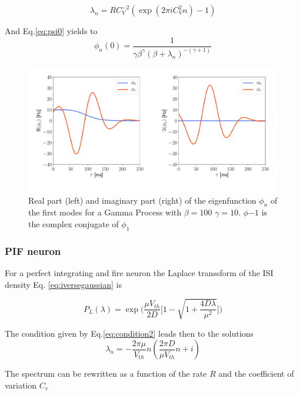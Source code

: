 \documentclass[a4paper,11pt,twoside]{article}
\numberwithin{equation}{section}
\begin{document}
\begin{equation}
\lambda_n=RC_V^{-2}(\exp(2\pi iC_V^2 n)-1)
\end{equation}

And Eq.\ref{eq:psi0} yields to
\begin{equation}
\phi_n(0)=\frac{1}{\gamma\beta^\gamma(\beta+\lambda_n)^{-(\gamma+1)}}
\end{equation}


\begin{figure}
	\centering
	\includegraphics[width=0.8\linewidth]{gamma_eigenfunction.pdf}
	\caption{Real part (left) and imaginary part (right) of the eigenfunction $\phi_n$ of the first modes for a Gamma Process with $\beta=100$
		$\gamma=10$. $\phi{-1}$ is the complex conjugate of  $\phi_{1}$}
	\label{fig:gammaeigenfunction}
\end{figure}



\subsubsection{PIF neuron}

For a perfect integrating and  fire neuron the Laplace transsform of the ISI density Eq. \eqref{eq:iversegaussian} is

\begin{equation}
P_L(\lambda)=\exp\big(\frac{\mu V_{th}}{2D}\big[1-\sqrt{1+\frac{4D\lambda}{\mu^2}}\big]\big)
\end{equation}



The condition given by Eq.\eqref{eq:condition2} leads then to the solutions
\begin{equation}
 \lambda_n=- \frac{2\pi\mu}{V_{th}}n( \frac{2\pi D}{\mu V_{th}}n + i)
\end{equation}

The spectrum can be rewritten as a function of the rate $R$ and the coefficient of variation $C_v$
\end{document}
